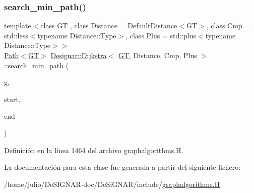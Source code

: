 \subsubsection{\texorpdfstring{search\+\_\+min\+\_\+path()}{search\_min\_path()}}
{\footnotesize\ttfamily template$<$class GT , class Distance  = Default\+Distance$<$\+G\+T$>$, class Cmp  = std\+::less$<$typename Distance\+::\+Type$>$, class Plus  = std\+::plus$<$typename Distance\+::\+Type$>$$>$ \\
\hyperlink{class_designar_1_1_path}{Path}$<$\hyperlink{demo-buildgraph_8_c_a3001c40d2c31ca87ed96cd7d1334a55e}{GT}$>$ \hyperlink{class_designar_1_1_dijkstra}{Designar\+::\+Dijkstra}$<$ \hyperlink{demo-buildgraph_8_c_a3001c40d2c31ca87ed96cd7d1334a55e}{GT}, Distance, Cmp, Plus $>$\+::search\+\_\+min\+\_\+path (\begin{DoxyParamCaption}\item[{\hyperlink{demo-buildgraph_8_c_a3001c40d2c31ca87ed96cd7d1334a55e}{GT} \&}]{g,  }\item[{\hyperlink{class_designar_1_1_dijkstra_afeb644fc5395569ec366f0d220ab477d}{Node} \&}]{start,  }\item[{\hyperlink{class_designar_1_1_dijkstra_afeb644fc5395569ec366f0d220ab477d}{Node} \&}]{end }\end{DoxyParamCaption})\hspace{0.3cm}{\ttfamily [inline]}}



Definición en la línea 1464 del archivo graphalgorithms.\+H.



La documentación para esta clase fue generada a partir del siguiente fichero\+:\begin{DoxyCompactItemize}
\item 
/home/julio/\+De\+S\+I\+G\+N\+A\+R-\/doc/\+De\+Si\+G\+N\+A\+R/include/\hyperlink{graphalgorithms_8_h}{graphalgorithms.\+H}\end{DoxyCompactItemize}
